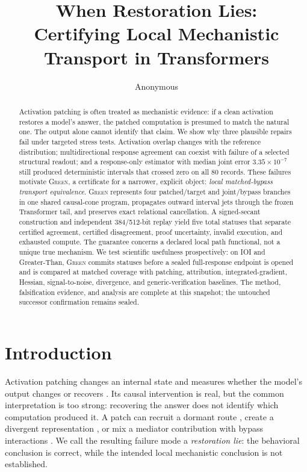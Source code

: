 \documentclass{article}
\title{When Restoration Lies:\\
Certifying Local Mechanistic Transport in Transformers}
\author{Anonymous}
\newcommand{\green}{\textsc{Green}}
\begin{document}
\maketitle

\begin{abstract}
Activation patching is often treated as mechanistic evidence: if a clean activation restores a model's answer, the patched computation is presumed to match the natural one. The output alone cannot identify that claim. We show why three plausible repairs fail under targeted stress tests. Activation overlap changes with the reference distribution; multidirectional response agreement can coexist with failure of a selected structural readout; and a response-only estimator with median joint error $3.35\times10^{-7}$ still produced deterministic intervals that crossed zero on all 80 records. These failures motivate \green{}, a certificate for a narrower, explicit object: \emph{local matched-bypass transport equivalence}. \green{} represents four patched/target and joint/bypass branches in one shared causal-cone program, propagates outward interval jets through the frozen Transformer tail, and preserves exact relational cancellation. A signed-secant construction and independent 384/512-bit replay yield five total statuses that separate certified agreement, certified disagreement, proof uncertainty, invalid execution, and exhausted compute. The guarantee concerns a declared local path functional, not a unique true mechanism. We test scientific usefulness prospectively: on IOI and Greater-Than, \green{} commits statuses before a sealed full-response endpoint is opened and is compared at matched coverage with patching, attribution, integrated-gradient, Hessian, signal-to-noise, divergence, and generic-verification baselines. The method, falsification evidence, and analysis are complete at this snapshot; the untouched successor confirmation remains sealed.
\end{abstract}

\section{Introduction}
\label{sec:intro}

Activation patching changes an internal state and measures whether the model's output changes or recovers \citep{vig2020investigating,zhang2024best}. Its causal intervention is real, but the common interpretation is too strong: recovering the answer does not identify which computation produced it. A patch can recruit a dormant route \citep{makelov2024illusion}, create a divergent representation \citep{grant2026addressing}, or mix a mediator contribution with bypass interactions \citep{vaidyanathan2026mediators}. We call the resulting failure mode a \emph{restoration lie}: the behavioral conclusion is correct, while the intended local mechanistic conclusion is not established.
\end{document}
